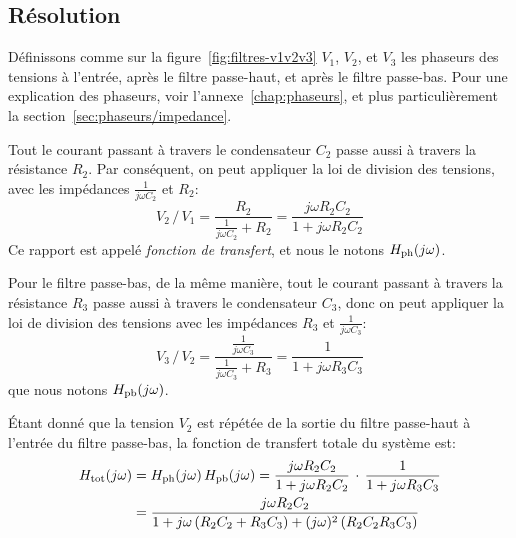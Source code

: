 \subsection{Résolution}

Définissons comme sur la figure~\ref{fig:filtres-v1v2v3}
$V_1$, $V_2$, et $V_3$ les phaseurs des tensions
à l'entrée, après le filtre passe-haut, et après le filtre passe-bas.
Pour une explication des phaseurs, voir l'annexe~\ref{chap:phaseurs},
et plus particulièrement la section~\ref{sec:phaseurs/impedance}.

Tout le courant passant à travers le condensateur $C_2$ passe
aussi à travers la résistance $R_2$.
Par conséquent, on peut appliquer la loi de division des tensions,
avec les impédances $\frac{1}{j\omega C_2}$ et $R_2$:
\begin{equation}
    V_2\,/\,V_1
    = \frac{R_2}{\frac{1}{j\omega C_2} + R_2}
    = \frac{j\omega R_2C_2}{1+j\omega R_2C_2}
\end{equation}
Ce rapport est appelé \emph{fonction de transfert}, et nous le notons
$H_{\mathrm{ph}}(j\omega)$.

Pour le filtre passe-bas, de la même manière, tout le courant
passant à travers la résistance $R_3$ passe aussi à travers le
condensateur $C_3$, donc on peut appliquer
la loi de division des tensions avec les impédances
$R_3$ et $\frac{1}{j\omega C_3}$:
\begin{equation}
    V_3\,/\,V_2
    = \frac{\frac{1}{j\omega C_3}}{\frac{1}{j\omega C_3} + R_3}
    = \frac{1}{1+j\omega R_3C_3}
\end{equation}
que nous notons $H_{\mathrm{pb}}(j\omega)$.

Étant donné que la tension $V_2$ est répétée de la sortie du filtre passe-haut
à l'entrée du filtre passe-bas, la fonction de transfert totale du système est:
\begin{align}
    H_{\mathrm{tot}}(j\omega) &= H_{\mathrm{ph}}(j\omega)\,H_{\mathrm{pb}}(j\omega) =
    \frac{j\omega R_2C_2}{1 + j\omega R_2C_2}\,\cdot\,
    \frac{1}{1 + j\omega R_3C_3}\\
    &= \frac{j\omega R_2C_2}{1 + j\omega\,(R_2C_2+R_3C_3) +
        (j\omega)^2\,(R_2C_2R_3C_3)}
\end{align}
